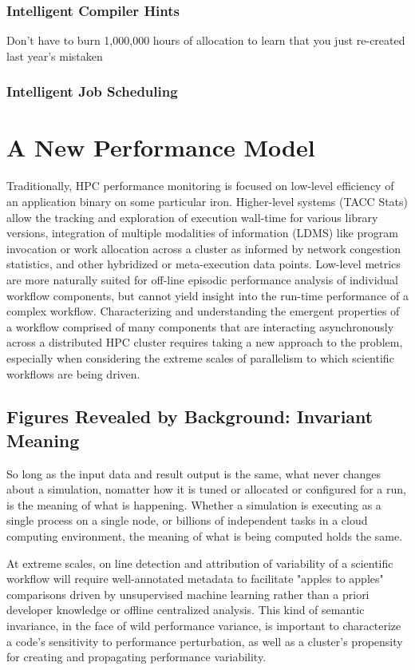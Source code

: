 \subsubsection{Intelligent Compiler Hints}
Don't have to burn 1,000,000 hours of allocation to learn that you
just re-created last year's mistaken
\subsubsection{Intelligent Job Scheduling}



\section{A New Performance Model}
Traditionally, HPC performance monitoring is focused on low-level
efficiency of an application binary on some particular iron.
Higher-level systems (TACC Stats) allow the tracking and exploration
of execution wall-time for various library versions, integration of
multiple modalities of information (LDMS) like program invocation or
work allocation across a cluster as informed by network congestion
statistics, and other hybridized or meta-execution data points.
Low-level metrics are more naturally suited for off-line episodic
performance analysis of individual workflow components, but cannot
yield insight into the run-time performance of a complex workflow.
Characterizing and understanding the emergent properties of a workflow
comprised of many components that are interacting asynchronously
across a distributed HPC cluster requires taking a new approach to the
problem, especially when considering the extreme scales of parallelism
to which scientific workflows are being driven.

\subsection{Figures Revealed by Background: Invariant Meaning}
So long as the input data and result output is the same, what never
changes about a simulation, nomatter how it is tuned or allocated or
configured for a run, is the meaning of what is happening.  Whether a
simulation is executing as a single process on a single node, or
billions of independent tasks in a cloud computing environment, the
meaning of what is being computed holds the same.

At extreme scales, on line detection and attribution of variability of
a scientific workflow will require well-annotated metadata to
facilitate "apples to apples" comparisons driven by unsupervised
machine learning rather than a priori developer knowledge or offline
centralized analysis. This kind of semantic invariance, in the face of
wild performance variance, is important to characterize a code's
sensitivity to performance perturbation, as well as a cluster's
propensity for creating and propagating performance variability.

